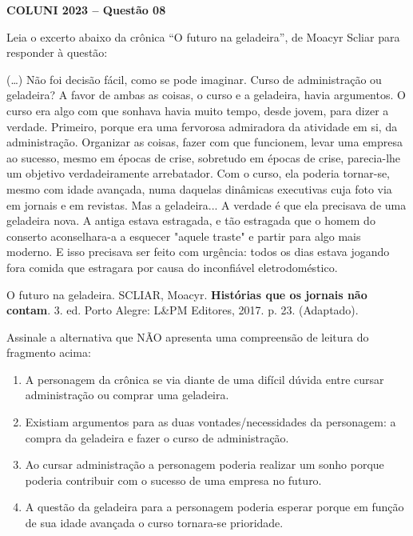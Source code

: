 \textbf{COLUNI 2023 -- Questão 08}\par\medskip Leia o excerto abaixo da crônica “O futuro na geladeira”, de Moacyr Scliar para responder à questão:

\par

(…) Não foi decisão fácil, como se pode imaginar. Curso de administração ou geladeira? A favor de ambas as coisas, o curso e a geladeira, havia argumentos. O curso era algo com que sonhava havia muito tempo, desde jovem, para dizer a verdade. Primeiro, porque era uma fervorosa admiradora da atividade em si, da administração. Organizar as coisas, fazer com que funcionem, levar uma empresa ao sucesso, mesmo em épocas de crise, sobretudo em épocas de crise, parecia-lhe um objetivo verdadeiramente arrebatador. Com o curso, ela poderia tornar-se, mesmo com idade avançada, numa daquelas dinâmicas executivas cuja foto via em jornais e em revistas. Mas a geladeira... A verdade é que ela precisava de uma geladeira nova. A antiga estava estragada, e tão estragada que o homem do conserto aconselhara-a a esquecer "aquele traste" e partir para algo mais moderno. E isso precisava ser feito com urgência: todos os dias estava jogando fora comida que estragara por causa do inconfiável eletrodoméstico.

\par

O futuro na geladeira. SCLIAR, Moacyr. \textbf{Histórias que os jornais não contam}. 3. ed. Porto Alegre: L\&PM Editores, 2017. p. 23. (Adaptado).

\par

Assinale a alternativa que NÃO apresenta uma compreensão de leitura do fragmento acima:\begin{enumerate}
\item A personagem da crônica se via diante de uma difícil dúvida entre cursar administração ou comprar uma
       geladeira.
\item Existiam argumentos para as duas vontades/necessidades da personagem: a compra da geladeira e fazer
       o curso de administração.
\item Ao cursar administração a personagem poderia realizar um sonho porque poderia contribuir com o
       sucesso de uma empresa no futuro.
\item A questão da geladeira para a personagem poderia esperar porque em função de sua idade avançada o
       curso tornara-se prioridade.\end{enumerate}
